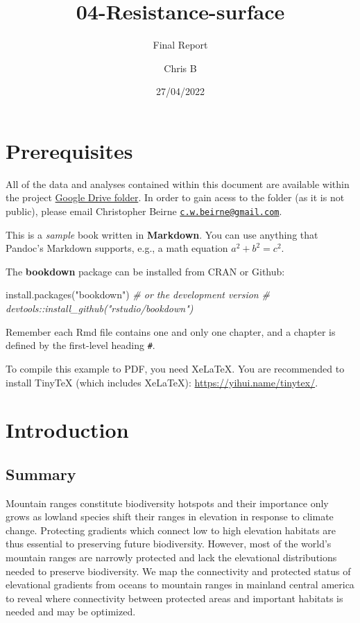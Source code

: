\documentclass[
]{book}
\title{04-Resistance-surface}
\subtitle{Final Report}
\author{Chris B}
\date{27/04/2022}
\newenvironment{Shaded}{\begin{snugshade}}{\end{snugshade}}
\newcommand{\CommentTok}[1]{\textcolor[rgb]{0.56,0.35,0.01}{\textit{#1}}}
\newcommand{\FunctionTok}[1]{\textcolor[rgb]{0.00,0.00,0.00}{#1}}
\newcommand{\NormalTok}[1]{#1}
\newcommand{\StringTok}[1]{\textcolor[rgb]{0.31,0.60,0.02}{#1}}
\begin{document}
\maketitle

{
\setcounter{tocdepth}{1}
\tableofcontents
}
\hypertarget{prerequisites}{%
\chapter{Prerequisites}\label{prerequisites}}

All of the data and analyses contained within this document are available within the project \href{https://drive.google.com/drive/u/0/folders/16WO_xH6B66D0dqyfeISHEB0mfU9cWWZg}{Google Drive folder}. In order to gain acess to the folder (as it is not public), please email Christopher Beirne \href{mailto:c.w.beirne@gmail.com}{\nolinkurl{c.w.beirne@gmail.com}}.

This is a \emph{sample} book written in \textbf{Markdown}. You can use anything that Pandoc's Markdown supports, e.g., a math equation \(a^2 + b^2 = c^2\).

The \textbf{bookdown} package can be installed from CRAN or Github:

\begin{Shaded}
\begin{Highlighting}[]
\FunctionTok{install.packages}\NormalTok{(}\StringTok{"bookdown"}\NormalTok{)}
\CommentTok{\# or the development version}
\CommentTok{\# devtools::install\_github("rstudio/bookdown")}
\end{Highlighting}
\end{Shaded}

Remember each Rmd file contains one and only one chapter, and a chapter is defined by the first-level heading \texttt{\#}.

To compile this example to PDF, you need XeLaTeX. You are recommended to install TinyTeX (which includes XeLaTeX): \url{https://yihui.name/tinytex/}.

\hypertarget{intro}{%
\chapter{Introduction}\label{intro}}

\hypertarget{summary}{%
\section{Summary}\label{summary}}

Mountain ranges constitute biodiversity hotspots and their importance only grows as lowland species shift their ranges in elevation in response to climate change. Protecting gradients which connect low to high elevation habitats are thus essential to preserving future biodiversity. However, most of the world's mountain ranges are narrowly protected and lack the elevational distributions needed to preserve biodiversity. We map the connectivity and protected status of elevational gradients from oceans to mountain ranges in mainland central america to reveal where connectivity between protected areas and important habitats is needed and may be optimized.
\end{document}
